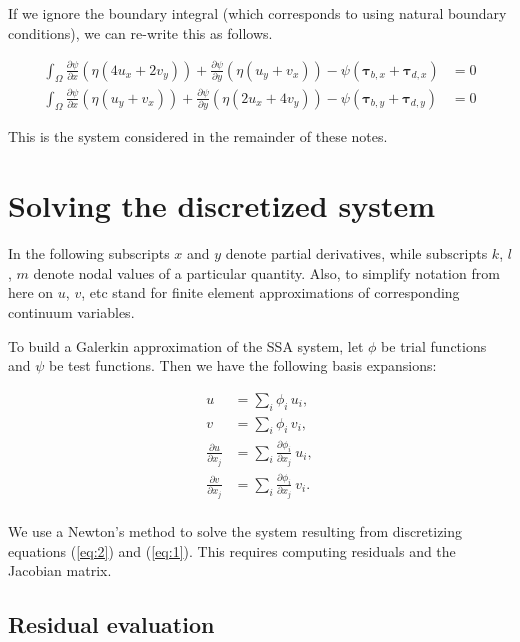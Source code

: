 \documentclass{amsart}
\newcommand{\I}{\ensuremath{\int_{\Omega}}}
\newcommand{\diff}[2]{\ensuremath{\frac{\partial #1}{\partial #2}}}
\newcommand{\basalshearstress}[1]{\boldsymbol{\tau}_{b#1}}
\newcommand{\taubx}{\basalshearstress{,x}}
\newcommand{\tauby}{\basalshearstress{,y}}
\newcommand{\drivingstress}[1]{\boldsymbol{\tau}_{d#1}}
\newcommand{\taudx}{\drivingstress{,x}}
\newcommand{\taudy}{\drivingstress{,y}}
\begin{document}
If we ignore the boundary integral (which corresponds to using natural boundary conditions), we can re-write this as follows.

\begin{align}
  \label{eq:2}
  \I \diff{\psi}{x} \left( \eta (4 u_x + 2 v_y) \right) + \diff{\psi}{y} \left( \eta (u_y + v_x) \right) - \psi (\taubx + \taudx) & = 0\\
  \label{eq:1}
  \I \diff{\psi}{x} \left( \eta (u_y + v_x) \right) + \diff{\psi}{y} \left( \eta (2 u_x + 4 v_y) \right) - \psi (\tauby + \taudy) & = 0
\end{align}

This is the system considered in the remainder of these notes.

\section{Solving the discretized system}
\label{sec-3}

In the following subscripts $x$ and $y$ denote partial derivatives, while subscripts $k$, $l$, $m$ denote nodal values of a particular quantity. Also, to simplify notation from here on $u$, $v$, etc stand for finite element approximations of corresponding continuum variables.

To build a Galerkin approximation of the SSA system, let $\phi$ be trial functions and $\psi$ be test functions. Then we have the following basis expansions:

\begin{equation}
  \label{eq:5}
  \begin{aligned}
    u & = \sum_i \phi_i\, u_i, \\
    v & = \sum_i \phi_i\, v_i,\\
    \diff{u}{x_j} & = \sum_i \diff{\phi_i}{x_j}\ u_i,\\
    \diff{v}{x_j} & = \sum_i \diff{\phi_i}{x_j}\ v_i.\\
  \end{aligned}
\end{equation}

We use a Newton's method to solve the system resulting from discretizing equations (\ref{eq:2}) and (\ref{eq:1}). This requires computing residuals and the Jacobian matrix.

\subsection{Residual evaluation}
\label{sec-3-1}
\end{document}
